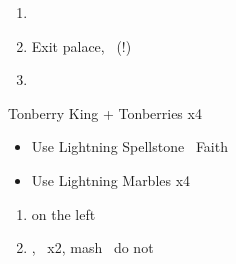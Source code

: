 \begin{enumerate}[resume]
    \item \cs\
    \item Exit palace, \cs\ (!)
    \item {}
\end{enumerate}
\begin{battle}[]{Tonberry King + Tonberries x4}
    \begin{itemize}
        \item Use Lightning Spellstone
        \reynnf\ Faith
        \item Use Lightning Marbles x4
    \end{itemize}
\end{battle}
\begin{enumerate}[resume]
    \item {} on the left
    \item {}, \cs\ x2, mash \cs\, do not \save\
\end{enumerate}